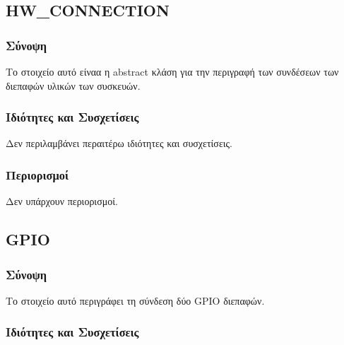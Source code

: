 \subsection{HW\_CONNECTION}
\label{subsec:hw_connection}

\subsubsection*{Σύνοψη}

\noindent Το στοιχείο αυτό είναα η abstract κλάση για την περιγραφή των συνδέσεων των διεπαφών υλικών των συσκευών.

\subsubsection*{Ιδιότητες και Συσχετίσεις}

\noindent Δεν περιλαμβάνει περαιτέρω ιδιότητες και συσχετίσεις.

\subsubsection*{Περιορισμοί}

\noindent Δεν υπάρχουν περιορισμοί.

\subsection{GPIO}
\label{subsec:gpio_con}

\subsubsection*{Σύνοψη}

\noindent Το στοιχείο αυτό περιγράφει τη σύνδεση δύο GPIO διεπαφών.

\subsubsection*{Ιδιότητες και Συσχετίσεις}

